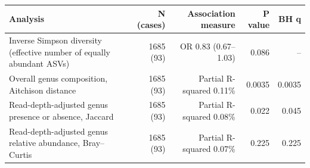 \begin{tabular}{>{\raggedright\arraybackslash}p{}rrrr}
\toprule
Analysis & N (cases) & Association measure & P value & BH q \\
\midrule
Inverse Simpson diversity (effective number of equally abundant ASVs) & 1685 (93) & OR 0.83 (0.67--1.03) & 0.086 & -- \\
Overall genus composition, Aitchison distance & 1685 (93) & Partial R-squared 0.11\% & 0.0035 & 0.0035 \\
Read-depth-adjusted genus presence or absence, Jaccard & 1685 (93) & Partial R-squared 0.08\% & 0.022 & 0.045 \\
Read-depth-adjusted genus relative abundance, Bray--Curtis & 1685 (93) & Partial R-squared 0.07\% & 0.225 & 0.225 \\
\bottomrule
\end{tabular}
